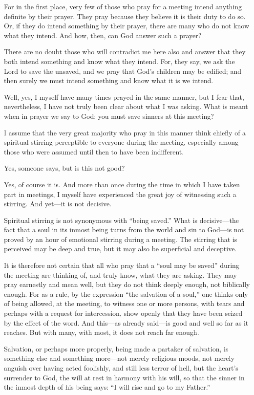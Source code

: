 For in the first place, very few of those who pray for a meeting intend anything definite by their prayer. They pray because they believe it is their duty to do so. Or, if they do intend something by their prayer, there are many who do not know what they intend. And how, then, can God answer such a prayer?

There are no doubt those who will contradict me here also and answer that they both intend something and know what they intend. For, they say, we ask the Lord to save the unsaved, and we pray that God’s children may be edified; and then surely we must intend something and know what it is we intend.

Well, yes, I myself have many times prayed in the same manner, but I fear that, nevertheless, I have not truly been clear about what I was asking. What is meant when in prayer we say to God: you must save sinners at this meeting?

I assume that the very great majority who pray in this manner think chiefly of a spiritual stirring perceptible to everyone during the meeting, especially among those who were assumed until then to have been indifferent.

Yes, someone says, but is this not good?

Yes, of course it is. And more than once during the time in which I have taken part in meetings, I myself have experienced the great joy of witnessing such a stirring. And yet—it is not decisive.

Spiritual stirring is not synonymous with “being saved.” What is decisive—the fact that a soul in its inmost being turns from the world and sin to God—is not proved by an hour of emotional stirring during a meeting. The stirring that is perceived may be deep and true, but it may also be superficial and deceptive.

It is therefore not certain that all who pray that a “soul may be saved” during the meeting are thinking of, and truly know, what they are asking. They may pray earnestly and mean well, but they do not think deeply enough, not biblically enough. For as a rule, by the expression “the salvation of a soul,” one thinks only of being allowed, at the meeting, to witness one or more persons, with tears and perhaps with a request for intercession, show openly that they have been seized by the effect of the word. And this—as already said—is good and well so far as it reaches. But with many, with most, it does not reach far enough.

Salvation, or perhaps more properly, being made a partaker of salvation, is something else and something more—not merely religious moods, not merely anguish over having acted foolishly, and still less terror of hell, but the heart’s surrender to God, the will at rest in harmony with his will, so that the sinner in the inmost depth of his being says: “I will rise and go to my Father.”


